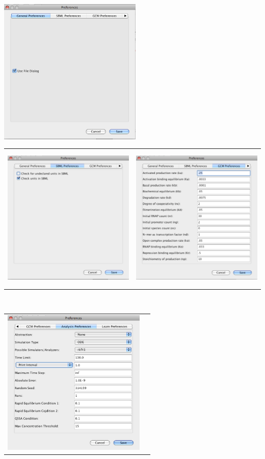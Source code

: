 \documentclass[titlepage,11pt]{article}
\begin{document}
\begin{center}
\includegraphics[height=70mm]{screenshots/GenPref}\\
\begin{tabular}{cc}
\includegraphics[height=70mm]{screenshots/SBMLPref} &
\includegraphics[height=70mm]{screenshots/GCMPref} 
\end{tabular} \\
\begin{tabular}{cc}
\includegraphics[height=70mm]{screenshots/AnaPref} &

\end{tabular}
\end{center}
\end{document}
